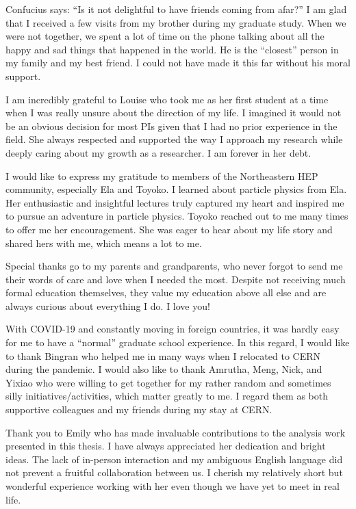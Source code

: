 \begin{acknowledgments}

Confucius says: ``Is it not delightful to have friends coming from afar?'' I am glad that I received a few visits from my brother during my graduate study. When we were not together, we spent a lot of time on the phone talking about all the happy and sad things that happened in the world. He is the ``closest'' person in my family and my best friend. I could not have made it this far without his moral support.

I am incredibly grateful to Louise who took me as her first student at a time when I was really unsure about the direction of my life. I imagined it would not be an obvious decision for most PIs given that I had no prior experience in the field. She always respected and supported the way I approach my research while deeply caring about my growth as a researcher. I am forever in her debt.  

I would like to express my gratitude to members of the Northeastern HEP community, especially Ela and Toyoko. I learned about particle physics from Ela. Her enthusiastic and insightful lectures truly captured my heart and inspired me to pursue an adventure in particle physics. Toyoko reached out to me many times to offer me her encouragement. She was eager to hear about my life story and shared hers with me, which means a lot to me.

Special thanks go to my parents and grandparents, who never forgot to send me their words of care and love when I needed the most. Despite not receiving much formal education themselves, they value my education above all else and are always curious about everything I do. I love you!

With COVID-19 and constantly moving in foreign countries, it was hardly easy for me to have a ``normal'' graduate school experience. In this regard, I would like to thank Bingran who helped me in many ways when I relocated to CERN during the pandemic. I would also like to thank Amrutha, Meng, Nick, and Yixiao who were willing to get together for my rather random and sometimes silly initiatives/activities, which matter greatly to me. I regard them as both supportive colleagues and my friends during my stay at CERN.

Thank you to Emily who has made invaluable contributions to the analysis work presented in this thesis. I have always appreciated her dedication and bright ideas. The lack of in-person interaction and my ambiguous English language did not prevent a fruitful collaboration between us. I cherish my relatively short but wonderful experience working with her even though we have yet to meet in real life.

\end{acknowledgments}